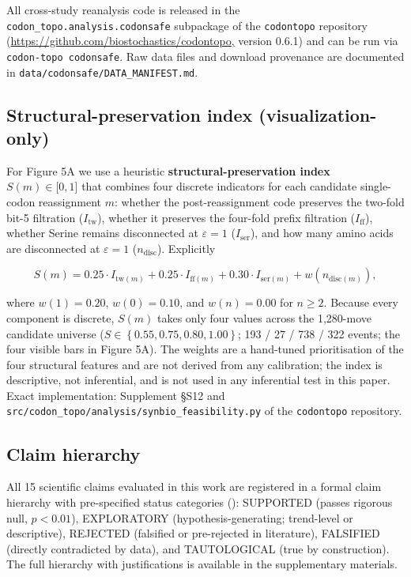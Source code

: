 \documentclass[preprint,11pt,authoryear,a4paper]{elsarticle}
\begin{document}
All cross-study reanalysis code is released in the
\texttt{codon\_topo.analysis.codonsafe} subpackage of the
\texttt{codontopo} repository
(\url{https://github.com/biostochastics/codontopo,} version 0.6.1) and
can be run via \texttt{codon-topo\ codonsafe}. Raw data files and
download provenance are documented in
\texttt{data/codonsafe/DATA\_MANIFEST.md}.

\subsection{Structural-preservation index
(visualization-only)}\label{sec:methods-feasibility}

For Figure 5A we use a heuristic \textbf{structural-preservation index}
\(S(m) \in \lbrack 0,1\rbrack\) that combines four discrete indicators
for each candidate single-codon reassignment \(m\): whether the
post-reassignment code preserves the two-fold bit-5 filtration
(\(I_{\text{tw}}\)), whether it preserves the four-fold prefix
filtration (\(I_{\text{ff}}\)), whether Serine remains disconnected at
\(\varepsilon = 1\) (\(I_{\text{ser}}\)), and how many amino acids are
disconnected at \(\varepsilon = 1\) (\(n_{\text{disc}}\)). Explicitly

\[S(m) = 0.25 \cdot I_{\text{tw}(m)} + 0.25 \cdot I_{\text{ff}(m)} + 0.30 \cdot I_{\text{ser}(m)} + w\left( n_{\text{disc}(m)} \right),\]

where \(w(1) = 0.20\), \(w(0) = 0.10\), and \(w(n) = 0.00\) for
\(n \geq 2\). Because every component is discrete, \(S(m)\) takes only
four values across the 1,280-move candidate universe
(\(S \in \left\{ 0.55,0.75,0.80,1.00 \right\}\); 193 / 27 / 738 / 322
events; the four visible bars in Figure 5A). The weights are a
hand-tuned prioritisation of the four structural features and are not
derived from any calibration; the index is descriptive, not inferential,
and is not used in any inferential test in this paper. Exact
implementation: Supplement §S12 and
\texttt{src/codon\_topo/analysis/synbio\_feasibility.py} of the
\texttt{codontopo} repository.

\subsection{Claim hierarchy}\label{sec:claims}

All 15 scientific claims evaluated in this work are registered in a
formal claim hierarchy with pre-specified status categories
(): SUPPORTED (passes rigorous null, \(p < 0.01\)),
EXPLORATORY (hypothesis-generating; trend-level or descriptive),
REJECTED (falsified or pre-rejected in literature), FALSIFIED (directly
contradicted by data), and TAUTOLOGICAL (true by construction). The full
hierarchy with justifications is available in the supplementary
materials.
\end{document}

